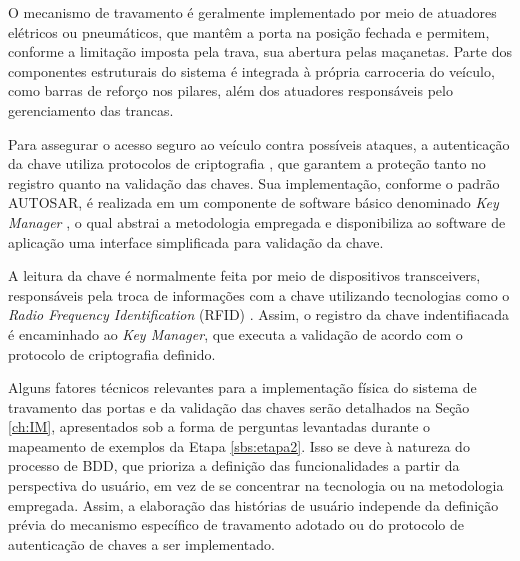 O mecanismo de travamento é geralmente implementado por meio de atuadores elétricos ou pneumáticos, que mantêm a porta na posição fechada e permitem, conforme a 
limitação imposta pela trava, sua abertura pelas maçanetas. Parte dos componentes estruturais do sistema é integrada à própria carroceria do veículo, como barras 
de reforço nos pilares, além dos atuadores responsáveis pelo gerenciamento das trancas. 

Para assegurar o acesso seguro ao veículo contra possíveis ataques, a autenticação da chave utiliza protocolos de criptografia \cite{glocker2016protocol}, que garantem 
a proteção tanto no registro quanto na validação das chaves. Sua implementação, conforme o padrão AUTOSAR, é realizada em um componente de software básico denominado 
\textit{Key Manager} \cite{autosarKeyManager}, o qual abstrai a metodologia empregada e disponibiliza ao software de aplicação uma interface simplificada para 
validação da chave.

A leitura da chave é normalmente feita por meio de dispositivos transceivers, responsáveis pela troca de informações com a chave utilizando tecnologias como o 
\textit{Radio Frequency Identification} (RFID) \cite{arduinoRFID}. Assim, o registro da chave indentifiacada é encaminhado ao \textit{Key Manager}, que executa 
a validação de acordo com o protocolo de criptografia definido.

Alguns fatores técnicos relevantes para a implementação física do sistema de travamento das portas e da validação das chaves serão detalhados na Seção \ref{ch:IM}, 
apresentados sob a forma de perguntas levantadas durante o mapeamento de exemplos da Etapa \ref{sbs:etapa2}. Isso se deve à natureza do processo de BDD, que prioriza 
a definição das funcionalidades a partir da perspectiva do usuário, em vez de se concentrar na tecnologia ou na metodologia empregada. Assim, a elaboração das 
histórias de usuário independe da definição prévia do mecanismo específico de travamento adotado ou do protocolo de autenticação de chaves a ser implementado.
